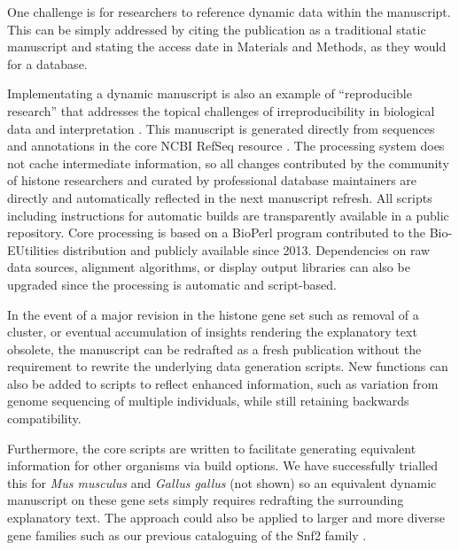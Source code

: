   One challenge is for researchers to reference dynamic data within the manuscript.
  This can be simply addressed by citing the publication as a traditional static manuscript
  and stating the access date in Materials and Methods, as they would for a database.

  Implementating a dynamic manuscript is also an example of ``reproducible research''
  \citep{reproducible-research-bioinformatics,reproducible-research-law}
  that addresses the topical challenges of irreproducibility in biological data
  and interpretation \citep{ErrorProne2012,OpenPrograms2012}.
  This manuscript is generated directly from sequences and annotations
  in the core NCBI RefSeq resource \citep{PruittRefseq2014}.
  The processing system does not cache intermediate information,
  so all changes contributed by the community of histone researchers
  and curated by professional database maintainers
  are directly and automatically reflected in the next manuscript refresh.
  All scripts including instructions for automatic builds
  are transparently available in a public repository.
  Core processing is based on a BioPerl program contributed to the Bio-EUtilities distribution
  and publicly available since 2013.
  Dependencies on raw data sources, alignment algorithms, or display output libraries
  can also be upgraded since the processing is automatic and script-based.

  In the event of a major revision in the histone gene set such as removal of a cluster,
  or eventual accumulation of insights rendering the explanatory text obsolete,
  the manuscript can be redrafted as a fresh publication
  without the requirement to rewrite the underlying data generation scripts.
  New functions can also be added to scripts to reflect enhanced information,
  such as variation from genome sequencing of multiple individuals,
  while still retaining backwards compatibility.

  Furthermore, the core scripts are written to facilitate generating
  equivalent information for other organisms via build options.
  We have successfully trialled this for \textit{Mus musculus}
  and \textit{Gallus gallus} (not shown)
  so an equivalent dynamic manuscript on these gene sets
  simply requires redrafting the surrounding explanatory text.
  The approach could also be applied to larger and more diverse gene families such as
  our previous cataloguing of the Snf2 family \citep{andrew-snf2-catalogue}.
